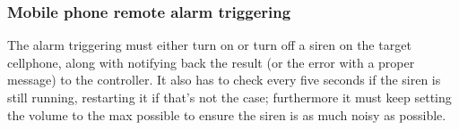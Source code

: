 \subsubsection{Mobile phone remote alarm triggering}
\small{The alarm triggering must either turn on or turn off a siren on the target cellphone, along with notifying back the result (or the error with a proper message) to the controller. It also has to check every five seconds if the siren is still running, restarting it if that's not the case; furthermore it must keep setting the volume to the max possible to ensure the siren is as much noisy as possible.}